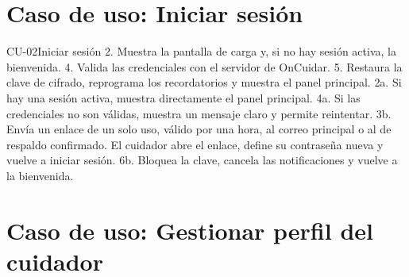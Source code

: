 \section*{Caso de uso: Iniciar sesión}

\begin{table}[H]
\centering
\caption{Especificación del caso de uso CU-02.}
\label{tab:cu-02}
\begin{especificacioncu}{CU-02}{Iniciar sesión}
           {2. Muestra la pantalla de carga y, si no hay sesión activa, la bienvenida.}
           {4. Valida las credenciales con el servidor de OnCuidar.}
    \cupaso{}
           {5. Restaura la clave de cifrado, reprograma los recordatorios y muestra el panel principal.}
    \cufinflujo
    \cupaso{}
           {2a. Si hay una sesión activa, muestra directamente el panel principal.}
    \cupaso{}
           {4a. Si las credenciales no son válidas, muestra un mensaje claro y permite reintentar.}
           {3b. Envía un enlace de un solo uso, válido por una hora, al correo principal o al de respaldo confirmado. El cuidador abre el enlace, define su contraseña nueva y vuelve a iniciar sesión.}
           {6b. Bloquea la clave, cancela las notificaciones y vuelve a la bienvenida.}
    \cufinflujo
\end{especificacioncu}
\end{table}

\section*{Caso de uso: Gestionar perfil del cuidador}

